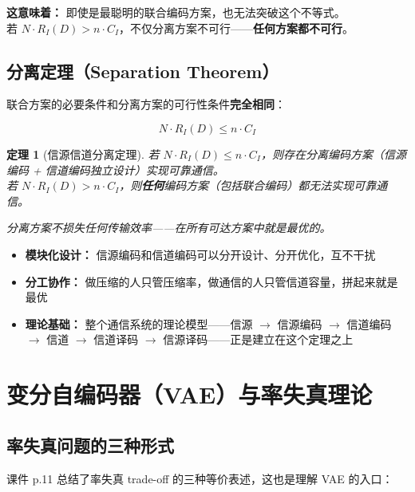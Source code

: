\documentclass[12pt,a4paper]{ctexart}
\newtheorem{theorem}{定理}[section]
\theoremstyle{definition}
\begin{document}
\textbf{这意味着：} 即使是最聪明的联合编码方案，也无法突破这个不等式。\\
若 $N \cdot R_I(D) > n \cdot C_I$，不仅分离方案不可行——\textbf{任何方案都不可行}。

\subsection{分离定理（Separation Theorem）}

联合方案的必要条件和分离方案的可行性条件\textbf{完全相同}：

\[
N \cdot R_I(D) \leq n \cdot C_I
\]

\begin{theorem}[信源信道分离定理]
若 $N \cdot R_I(D) \leq n \cdot C_I$，则存在分离编码方案（信源编码 + 信道编码独立设计）实现可靠通信。\\
若 $N \cdot R_I(D) > n \cdot C_I$，则\textbf{任何}编码方案（包括联合编码）都无法实现可靠通信。

分离方案不损失任何传输效率——在所有可达方案中就是最优的。
\end{theorem}

\begin{keybox}[分离定理的现实意义]
\begin{itemize}[nosep]
  \item \textbf{模块化设计：} 信源编码和信道编码可以分开设计、分开优化，互不干扰
  \item \textbf{分工协作：} 做压缩的人只管压缩率，做通信的人只管信道容量，拼起来就是最优
  \item \textbf{理论基础：} 整个通信系统的理论模型——信源 $\to$ 信源编码 $\to$ 信道编码 $\to$ 信道 $\to$ 信道译码 $\to$ 信源译码——正是建立在这个定理之上
\end{itemize}
\end{keybox}

\section{变分自编码器（VAE）与率失真理论}

\subsection{率失真问题的三种形式}

课件 p.11 总结了率失真 trade-off 的三种等价表述，这也是理解 VAE 的入口：
\end{document}
